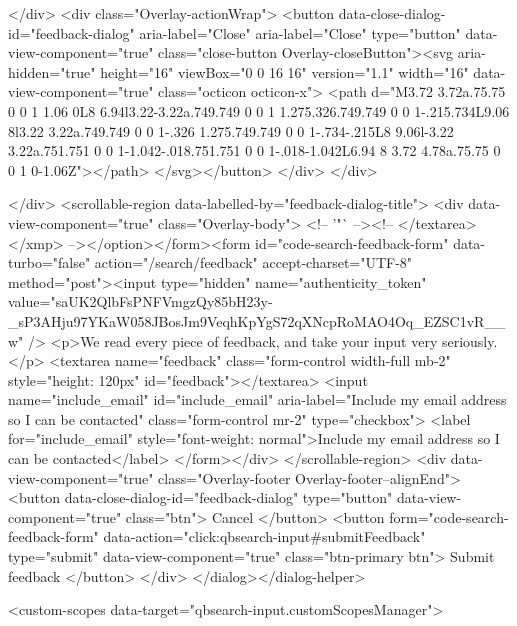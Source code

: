     </div>
    <div class="Overlay-actionWrap">
      <button data-close-dialog-id="feedback-dialog" aria-label="Close" aria-label="Close" type="button" data-view-component="true" class="close-button Overlay-closeButton"><svg aria-hidden="true" height="16" viewBox="0 0 16 16" version="1.1" width="16" data-view-component="true" class="octicon octicon-x">
    <path d="M3.72 3.72a.75.75 0 0 1 1.06 0L8 6.94l3.22-3.22a.749.749 0 0 1 1.275.326.749.749 0 0 1-.215.734L9.06 8l3.22 3.22a.749.749 0 0 1-.326 1.275.749.749 0 0 1-.734-.215L8 9.06l-3.22 3.22a.751.751 0 0 1-1.042-.018.751.751 0 0 1-.018-1.042L6.94 8 3.72 4.78a.75.75 0 0 1 0-1.06Z"></path>
</svg></button>
    </div>
  </div>
  
</div>
      <scrollable-region data-labelled-by="feedback-dialog-title">
        <div data-view-component="true" class="Overlay-body">        <!-- '"` --><!-- </textarea></xmp> --></option></form><form id="code-search-feedback-form" data-turbo="false" action="/search/feedback" accept-charset="UTF-8" method="post"><input type="hidden" name="authenticity_token" value="saUK2QlbFsPNFVmgzQy85bH23y-_sP3AHju97YKaW058JBosJm9VeqhKpYgS72qXNcpRoMAO4Oq_EZSC1vR__w" />
          <p>We read every piece of feedback, and take your input very seriously.</p>
          <textarea name="feedback" class="form-control width-full mb-2" style="height: 120px" id="feedback"></textarea>
          <input name="include_email" id="include_email" aria-label="Include my email address so I can be contacted" class="form-control mr-2" type="checkbox">
          <label for="include_email" style="font-weight: normal">Include my email address so I can be contacted</label>
</form></div>
      </scrollable-region>
      <div data-view-component="true" class="Overlay-footer Overlay-footer--alignEnd">          <button data-close-dialog-id="feedback-dialog" type="button" data-view-component="true" class="btn">    Cancel
</button>
          <button form="code-search-feedback-form" data-action="click:qbsearch-input#submitFeedback" type="submit" data-view-component="true" class="btn-primary btn">    Submit feedback
</button>
</div>
</dialog></dialog-helper>

    <custom-scopes data-target="qbsearch-input.customScopesManager">
    
